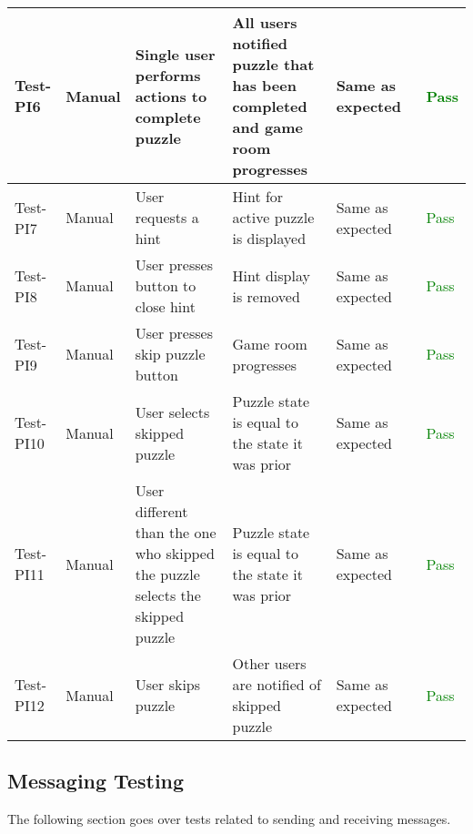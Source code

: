 \documentclass[12pt, titlepage]{article}
\begin{document}
\begin{table}[H]
{\begin{tabular}{|l|p{0.15\linewidth}|p{0.3\linewidth}|p{0.3\linewidth}|p{0.3\linewidth}|p{0.1\linewidth}|}
\hline
Test-PI6 & Manual & Single user performs actions to complete puzzle & All users notified puzzle that has been completed and game room progresses & Same as expected & \textcolor{Green}{Pass} \\
\hline
Test-PI7 & Manual & User requests a hint & Hint for active puzzle is displayed & Same as expected & \textcolor{Green}{Pass} \\
\hline
Test-PI8 & Manual & User presses button to close hint & Hint display is removed & Same as expected & \textcolor{Green}{Pass} \\
\hline
Test-PI9 & Manual & User presses skip puzzle button & Game room progresses & Same as expected & \textcolor{Green}{Pass} \\
\hline
Test-PI10 & Manual & User selects skipped puzzle & Puzzle state is equal to the state it was prior & Same as expected & \textcolor{Green}{Pass} \\
\hline
Test-PI11 & Manual & User different than the one who skipped the puzzle selects the skipped puzzle & Puzzle state is equal to the state it was prior & Same as expected & \textcolor{Green}{Pass} \\
\hline
Test-PI12 & Manual & User skips puzzle & Other users are notified of skipped puzzle & Same as expected & \textcolor{Green}{Pass} \\
\hline
\end{tabular}}
\label{table:PI1}
\end{table}

\subsection{Messaging Testing}
The following section goes over tests related to sending and receiving messages. 
\end{document}
